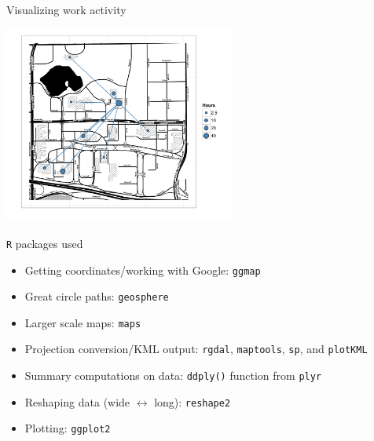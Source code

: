 \documentclass[sans,aspectratio=169,presentation,bigger,fleqn]{beamer}
\begin{document}
\begin{frame}[label=sec-34]{Visualizing work activity}
\begin{center}
\includegraphics[height=6.5cm]{./plots/mmm-timesheet.pdf}
\end{center}
\end{frame}
\begin{frame}[fragile,label=sec-35]{\texttt{R} packages used}
 \begin{itemize}
\item Getting coordinates/working with Google: \texttt{ggmap}
\item Great circle paths: \texttt{geosphere}
\item Larger scale maps: \texttt{maps}
\item Projection conversion/KML output: \texttt{rgdal}, \texttt{maptools}, \texttt{sp}, and \texttt{plotKML}
\item Summary computations on data: \texttt{ddply()} function from \texttt{plyr}
\item Reshaping data (wide \(\leftrightarrow\) long): \texttt{reshape2}
\item Plotting: \texttt{ggplot2}
\end{itemize}
\end{frame}
\end{document}
